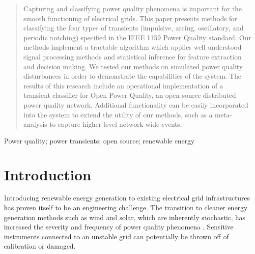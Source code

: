 \documentclass[10pt, conference, compsocconf]{IEEEtran}
\begin{document}




\maketitle


\begin{abstract}

Capturing and classifying power quality phenomena is important for the smooth functioning of electrical grids.  This paper presents methods for classifying the four types of transients (impulsive, arcing, oscillatory, and periodic notching) specified in the IEEE 1159 Power Quality standard. Our methods implement a tractable algorithm which applies well understood signal processing methods and statistical inference for feature extraction and decision making. We tested our methods on simulated power quality disturbances in order to demonstrate the capabilities of the system. The results of this research include an operational implementation of a transient classifier for Open Power Quality, an open source distributed power quality network. Additional functionality can be easily incorporated into the system to extend the utility of our methods, such as a meta-analysis to capture higher level network wide events.

\end{abstract}

\begin{IEEEkeywords}
Power quality; power transients; open source; renewable energy%
\end{IEEEkeywords}



%
\IEEEpeerreviewmaketitle



\section{Introduction}

Introducing renewable energy generation to existing electrical grid infrastructures has proven itself to be an engineering challenge. The transition to cleaner energy generation methods such as wind and solar, which are inherently stochastic, has increased the severity and frequency of power quality phenomena \cite{Radu:2014:RenewableImpacts}. Sensitive instruments connected to an unstable grid can potentially be thrown off of calibration or damaged.
\end{document}
